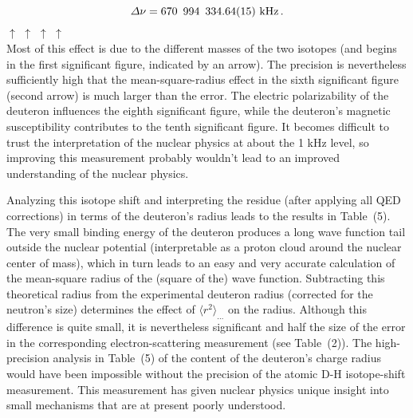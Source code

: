 \documentclass{svmult}
\begin{document}
\begin{equation}
\varDelta \nu = 670 \ \, 994 \ \, 334.64 (15) \ {\rm kHz} \, .
\end{equation}
\hspace*{1.71in} $\uparrow$ \hspace{0.25in} $\uparrow$ \hspace{0.05in} 
$\uparrow$ \hspace{0.01in} $\uparrow$ \\ Most of this effect is due to the
different masses of the two isotopes (and begins in the first significant
figure, indicated by an arrow). The precision is nevertheless sufficiently high
that the mean-square-radius effect in the sixth
significant figure (second arrow) is much larger than the error.  The electric
polarizability of the deuteron
influences the eighth significant figure, while the deuteron's magnetic
susceptibility contributes to the tenth
significant figure.  It becomes difficult to trust the interpretation of the
nuclear physics at about the 1 kHz level, so improving this measurement probably
wouldn't lead to an improved understanding of the nuclear physics.

Analyzing this isotope shift and interpreting the residue (after applying all
QED corrections) in terms of the deuteron's radius leads to the
results\cite{iso} in Table~(5). The very small binding energy of the deuteron
produces a long wave function tail outside the nuclear potential (interpretable
as  a proton cloud around the nuclear center of mass), which in turn leads to an
easy and very accurate calculation of the mean-square radius of the (square of
the) wave function. Subtracting this
theoretical radius from the experimental deuteron radius (corrected for the
neutron's size) determines the effect of $\langle
r^2 \rangle_{\ldots}$ on the radius. Although this difference is quite small, it
is nevertheless significant and half the size of the error in the corresponding
electron-scattering measurement (see Table~(2)). The high-precision analysis in
Table~(5) of the content of the deuteron's charge radius would have been
impossible without the precision of the atomic D-H isotope-shift measurement.
This measurement has given nuclear physics unique insight into small mechanisms
that are at present poorly understood\cite{MEC}.
\end{document}
